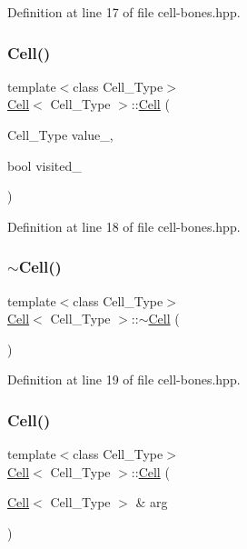 Definition at line 17 of file cell-\/bones.\+hpp.

\mbox{\label{class_cell_a62a4e587d2f02a22cbfae10658ec0fd5}} 
\subsubsection{\texorpdfstring{Cell()}{Cell()}\hspace{0.1cm}{\footnotesize\ttfamily [3/10]}}
{\footnotesize\ttfamily template$<$class Cell\+\_\+\+Type$>$ \\
\hyperlink{class_cell}{Cell}$<$ Cell\+\_\+\+Type $>$\+::\hyperlink{class_cell}{Cell} (\begin{DoxyParamCaption}\item[{Cell\+\_\+\+Type}]{value\+\_\+,  }\item[{bool}]{visited\+\_\+ }\end{DoxyParamCaption})\hspace{0.3cm}{\ttfamily [inline]}}



Definition at line 18 of file cell-\/bones.\+hpp.

\mbox{\label{class_cell_a12667d768c7eab9e295b3476a5d60c0e}} 
\subsubsection{\texorpdfstring{$\sim$\+Cell()}{~Cell()}}
{\footnotesize\ttfamily template$<$class Cell\+\_\+\+Type$>$ \\
\hyperlink{class_cell}{Cell}$<$ Cell\+\_\+\+Type $>$\+::$\sim$\hyperlink{class_cell}{Cell} (\begin{DoxyParamCaption}{ }\end{DoxyParamCaption})\hspace{0.3cm}{\ttfamily [inline]}}



Definition at line 19 of file cell-\/bones.\+hpp.

\mbox{\label{class_cell_ac116d4235eadb134018324455a9bbdbf}} 
\subsubsection{\texorpdfstring{Cell()}{Cell()}\hspace{0.1cm}{\footnotesize\ttfamily [4/10]}}
{\footnotesize\ttfamily template$<$class Cell\+\_\+\+Type$>$ \\
\hyperlink{class_cell}{Cell}$<$ Cell\+\_\+\+Type $>$\+::\hyperlink{class_cell}{Cell} (\begin{DoxyParamCaption}\item[{\hyperlink{class_cell}{Cell}$<$ Cell\+\_\+\+Type $>$ \&}]{arg }\end{DoxyParamCaption})\hspace{0.3cm}{\ttfamily [inline]}}



